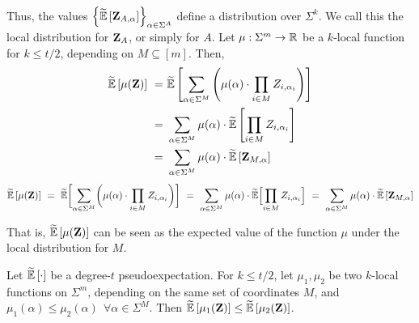 Thus, the values $\inbraces{\tildeEx{\zee_{A, \alpha}}}_{\alpha\in \Sigma^A}$ define a distribution
over $\Sigma^k$. We call this the local distribution for ${ \mathbf{Z} }_A$, or simply for $A$.
%
%
Let $\mu: \Sigma^m \rightarrow{\mathbb R}$ be a $k$-local function for $k\leq t/2$, depending on $M \subseteq
[m]$. Then,
%
\ifnum{}
\begin{align*}
	\tildeEx{\mu(\zee)} 
~=~& \tildeEx{\sum_{\alpha\in \Sigma^M} \inparen{\mu(\alpha) \cdot\prod_{i\in M} Z_{i,\alpha_i}}}\\
~=~& \sum_{\alpha\in \Sigma^M} \mu(\alpha) \cdot \tildeEx{\prod_{i\in M} Z_{i,\alpha_i}}\\
~=~& \sum_{\alpha\in \Sigma^M} \mu(\alpha) \cdot \tildeEx{\zee_{M,\alpha}}
\end{align*}
\else
\begin{align*}
	\tildeEx{\mu(\zee)} 
~=~ \tildeE\brackets[\bigg]{\sum_{\alpha\in \Sigma^M} \parens[\bigg]{\mu(\alpha) \cdot\prod_{i\in M} Z_{i,\alpha_i}}}
~=~ \sum_{\alpha\in \Sigma^M} \mu(\alpha) \cdot \tildeE\brackets[\Big]{\prod_{i\in M} Z_{i,\alpha_i}}
~=~ \sum_{\alpha\in \Sigma^M} \mu(\alpha) \cdot \tildeEx{\zee_{M,\alpha}}
\end{align*}
\fi
%

That is, $\tildeEx{\mu(\zee)}$ can be seen as the expected value of the function $\mu$ under the local distribution for $M$.

\begin{claim}\label{claim:sos_domination}
	Let $\tildeEx{\cdot}$ be a degree-$t$ pseudoexpectation. For $k \leq t/2$, let $\mu_1,\mu_2$
        be two $k$-local functions on $\Sigma^m$, depending on the same set of coordinates $M$, and
        $\mu_1(\alpha) \leq \mu_2(\alpha) ~~\forall \alpha \in \Sigma^M$. Then $\tildeEx{\mu_1(\zee)} \leq \tildeEx{\mu_2(\zee)}$.
%
\end{claim}


